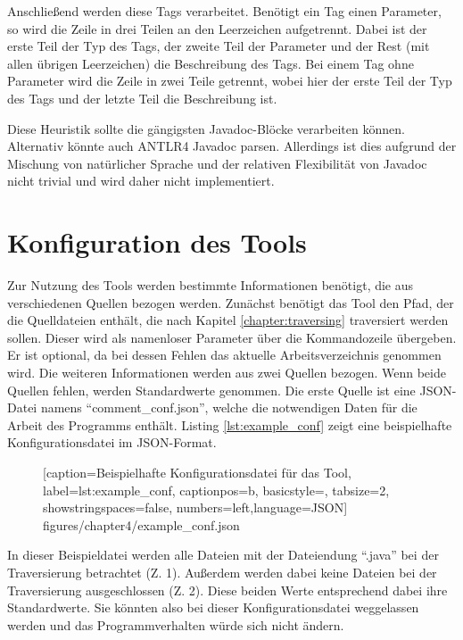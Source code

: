 Anschließend werden diese Tags verarbeitet. Benötigt ein Tag einen Parameter, so wird die Zeile in drei Teilen an den Leerzeichen aufgetrennt. Dabei ist der erste Teil der Typ des Tags, der zweite Teil der Parameter und der Rest (mit allen übrigen Leerzeichen) die Beschreibung des Tags.
Bei einem Tag ohne Parameter wird die Zeile in zwei Teile getrennt, wobei hier der erste Teil der Typ des Tags und der letzte Teil die Beschreibung ist.

Diese Heuristik sollte die gängigsten Javadoc-Blöcke verarbeiten können. Alternativ könnte auch ANTLR4 Javadoc parsen. Allerdings ist dies aufgrund der Mischung von natürlicher Sprache und der relativen Flexibilität von Javadoc nicht trivial und wird daher nicht implementiert. 



\section{Konfiguration des Tools}\label{chapter:conf}
Zur Nutzung des Tools werden bestimmte Informationen benötigt, die aus verschiedenen Quellen bezogen werden. Zunächst benötigt das Tool den Pfad, der die Quelldateien enthält, die nach Kapitel \ref{chapter:traversing} traversiert werden sollen. Dieser wird als namenloser Parameter über die Kommandozeile übergeben. Er ist optional, da bei dessen Fehlen das aktuelle Arbeitsverzeichnis genommen wird. Die weiteren Informationen werden aus zwei Quellen bezogen. Wenn beide Quellen fehlen, werden Standardwerte genommen. Die erste Quelle ist eine \ac{JSON}-Datei namens \mbox{\enquote{comment\_conf.json}}, welche die notwendigen Daten für die Arbeit des Programms enthält. Listing \ref{lst:example_conf} zeigt eine beispielhafte Konfigurationsdatei im \ac{JSON}-Format.

\begin{figure}[htbp]

[caption={Beispielhafte Konfigurationsdatei für das Tool},
label={lst:example_conf},
captionpos=b, basicstyle=\footnotesize, tabsize=2, showstringspaces=false,  numbers=left,language=JSON]
{figures/chapter4/example_conf.json}
\end{figure}

In dieser Beispieldatei  werden alle Dateien mit der Dateiendung \enquote{.java} bei der Traversierung betrachtet (Z. 1). Außerdem werden dabei keine Dateien bei der Traversierung ausgeschlossen (Z. 2). Diese beiden Werte entsprechend dabei ihre Standardwerte. Sie könnten also bei dieser Konfigurationsdatei weggelassen werden und das Programmverhalten würde sich nicht ändern.

